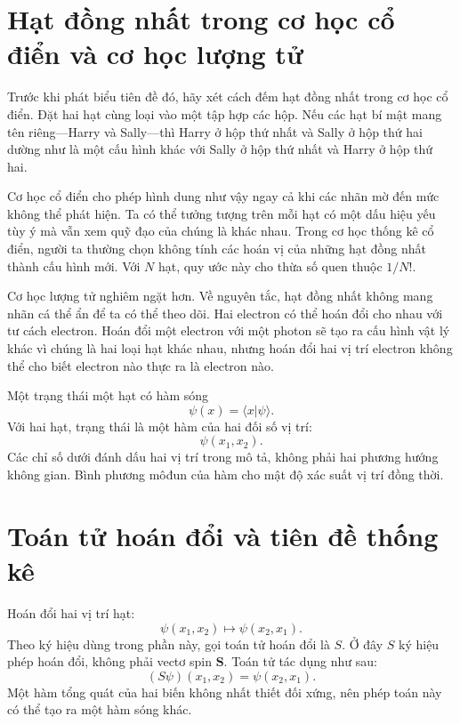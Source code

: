\section{Hạt đồng nhất trong cơ học cổ điển và cơ học lượng tử}

Trước khi phát biểu tiên đề đó, hãy xét cách đếm hạt đồng nhất trong cơ học cổ điển. Đặt hai hạt cùng loại vào một tập hợp các hộp. Nếu các hạt bí mật mang tên riêng---Harry và Sally---thì Harry ở hộp thứ nhất và Sally ở hộp thứ hai dường như là một cấu hình khác với Sally ở hộp thứ nhất và Harry ở hộp thứ hai.

Cơ học cổ điển cho phép hình dung như vậy ngay cả khi các nhãn mờ đến mức không thể phát hiện. Ta có thể tưởng tượng trên mỗi hạt có một dấu hiệu yếu tùy ý mà vẫn xem quỹ đạo của chúng là khác nhau. Trong cơ học thống kê cổ điển, người ta thường chọn không tính các hoán vị của những hạt đồng nhất thành cấu hình mới. Với \(N\) hạt, quy ước này cho thừa số quen thuộc \(1/N!\).

Cơ học lượng tử nghiêm ngặt hơn. Về nguyên tắc, hạt đồng nhất không mang nhãn cá thể ẩn để ta có thể theo dõi. Hai electron có thể hoán đổi cho nhau với tư cách electron. Hoán đổi một electron với một photon sẽ tạo ra cấu hình vật lý khác vì chúng là hai loại hạt khác nhau, nhưng hoán đổi hai vị trí electron không thể cho biết electron nào thực ra là electron nào.

Một trạng thái một hạt có hàm sóng
\[
\psi(x)=\langle x\vert\psi\rangle.
\]
Với hai hạt, trạng thái là một hàm của hai đối số vị trí:
\begin{equation}
\psi(x_{1},x_{2}).
\end{equation}
Các chỉ số dưới đánh dấu hai vị trí trong mô tả, không phải hai phương hướng không gian. Bình phương môđun của hàm cho mật độ xác suất vị trí đồng thời.

\section{Toán tử hoán đổi và tiên đề thống kê}

Hoán đổi hai vị trí hạt:
\begin{equation}
\psi(x_{1},x_{2})\longmapsto\psi(x_{2},x_{1}).
\end{equation}
Theo ký hiệu dùng trong phần này, gọi toán tử hoán đổi là \(S\). Ở đây \(S\) ký hiệu phép hoán đổi, không phải vectơ spin \(\mathbf S\). Toán tử tác dụng như sau:
\begin{equation}
(S\psi)(x_{1},x_{2})=\psi(x_{2},x_{1}).
\end{equation}
Một hàm tổng quát của hai biến không nhất thiết đối xứng, nên phép toán này có thể tạo ra một hàm sóng khác.

